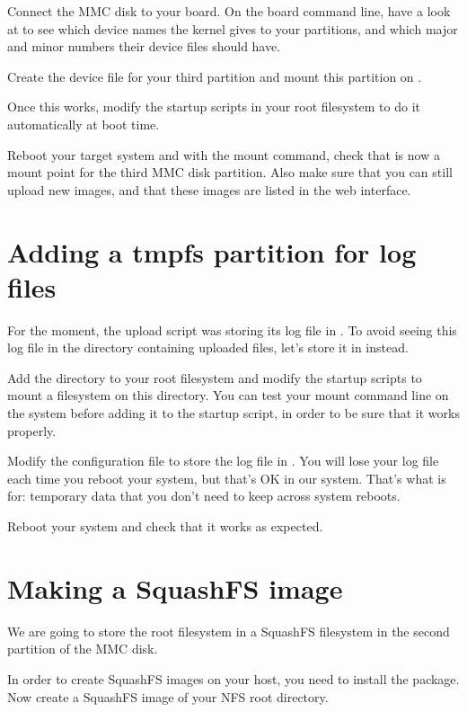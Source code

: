 Connect the MMC disk to your board. On the board command line,
have a look at  to see which device names
the kernel gives to your partitions, and which major and minor numbers
their device files should have.
  
Create the device file for your third partition and mount this partition
on .

Once this works, modify the startup scripts in your root filesystem
to do it automatically at boot time.

Reboot your target system and with the mount command, check that
 is now a mount point for the third MMC disk
partition. Also make sure that you can still upload new images, and
that these images are listed in the web interface.

\section{Adding a tmpfs partition for log files}

For the moment, the upload script was storing its log file in
. To avoid seeing this log file in
the directory containing uploaded files, let's store it in
 instead.

Add the  directory to your root filesystem and modify
the startup scripts to mount a  filesystem on this
directory. You can test your  mount command line on the
system before adding it to the startup script, in order to be sure
that it works properly.

Modify the  configuration file to store
the log file in . You will lose your log
file each time you reboot your system, but that's OK in our
system. That's what  is for: temporary data that you don't need
to keep across system reboots.

Reboot your system and check that it works as expected.

\section{Making a SquashFS image}

We are going to store the root filesystem in a SquashFS filesystem in
the second partition of the MMC disk.

In order to create SquashFS images on your host, you need to install
the  package. Now create a SquashFS image of your
NFS root directory.

